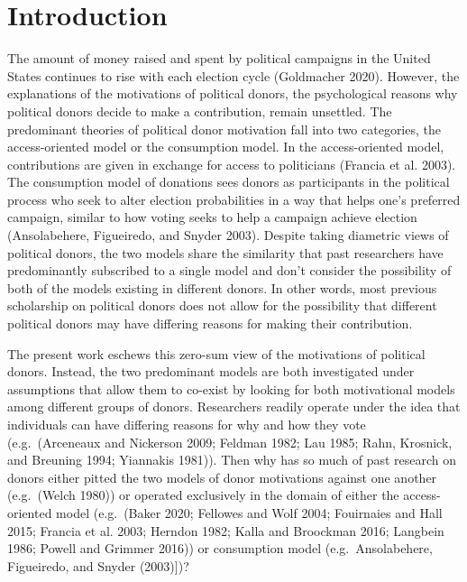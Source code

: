 \documentclass[12pt,]{article}
\begin{document}
\hypertarget{introduction}{%
\section{Introduction}\label{introduction}}

The amount of money raised and spent by political campaigns in the
United States continues to rise with each election cycle (Goldmacher
2020). However, the explanations of the motivations of political donors,
the psychological reasons why political donors decide to make a
contribution, remain unsettled. The predominant theories of political
donor motivation fall into two categories, the access-oriented model or
the consumption model. In the access-oriented model, contributions are
given in exchange for access to politicians (Francia et al. 2003). The
consumption model of donations sees donors as participants in the
political process who seek to alter election probabilities in a way that
helps one's preferred campaign, similar to how voting seeks to help a
campaign achieve election (Ansolabehere, Figueiredo, and Snyder 2003).
Despite taking diametric views of political donors, the two models share
the similarity that past researchers have predominantly subscribed to a
single model and don't consider the possibility of both of the models
existing in different donors. In other words, most previous scholarship
on political donors does not allow for the possibility that different
political donors may have differing reasons for making their
contribution.

The present work eschews this zero-sum view of the motivations of
political donors. Instead, the two predominant models are both
investigated under assumptions that allow them to co-exist by looking
for both motivational models among different groups of donors.
Researchers readily operate under the idea that individuals can have
differing reasons for why and how they vote (e.g.~(Arceneaux and
Nickerson 2009; Feldman 1982; Lau 1985; Rahn, Krosnick, and Breuning
1994; Yiannakis 1981)). Then why has so much of past research on donors
either pitted the two models of donor motivations against one another
(e.g.~(Welch 1980)) or operated exclusively in the domain of either the
access-oriented model (e.g.~(Baker 2020; Fellowes and Wolf 2004;
Fouirnaies and Hall 2015; Francia et al. 2003; Herndon 1982; Kalla and
Broockman 2016; Langbein 1986; Powell and Grimmer 2016)) or consumption
model (e.g.~Ansolabehere, Figueiredo, and Snyder (2003){]})?
\end{document}
